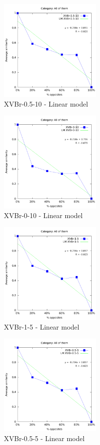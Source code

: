 \documentclass[a4paper,10pt]{article}
\begin{document}
\begin{figure}[ht]{\centering
\includegraphics[height=5cm]{allcat_XVBr-0_5-10_LM.pdf}
\caption{XVBr-0.5-10 - Linear model}
}\end{figure}
\begin{figure}[ht]{\centering
\includegraphics[height=5cm]{allcat_XVBr-0-10_LM.pdf}
\caption{XVBr-0-10 - Linear model}
}\end{figure}
\begin{figure}[ht]{\centering
\includegraphics[height=5cm]{allcat_XVBr-1-5_LM.pdf}
\caption{XVBr-1-5 - Linear model}
}\end{figure}
\begin{figure}[ht]{\centering
\includegraphics[height=5cm]{allcat_XVBr-0_5-5_LM.pdf}
\caption{XVBr-0.5-5 - Linear model}
}\end{figure}
\end{document}
